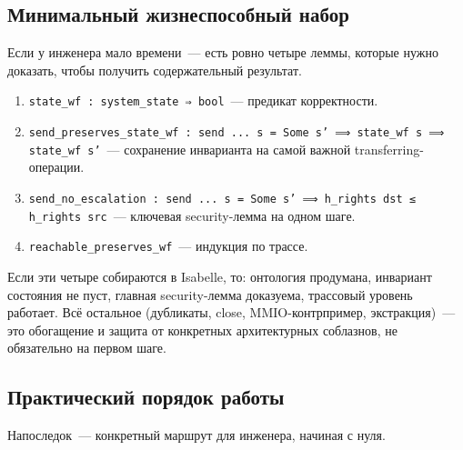 \documentclass[11pt,a4paper]{article}
\begin{document}
\subsection{Минимальный жизнеспособный набор}
\label{sec:port-mvp}

Если у инженера мало времени~--- есть ровно четыре леммы, которые нужно
доказать, чтобы получить содержательный результат.

\begin{enumerate}[leftmargin=1.4em]
	\item \texttt{state\_wf : system\_state ⇒ bool}~--- предикат корректности.
	\item \texttt{send\_preserves\_state\_wf : send ... s = Some s'
		      ⟹ state\_wf s ⟹ state\_wf s'}~--- сохранение инварианта на
	      самой важной transferring-операции.
	\item \texttt{send\_no\_escalation : send ... s = Some s'
		      ⟹ h\_rights dst ≤ h\_rights src}~--- ключевая security-лемма
	      на одном шаге.
	\item \texttt{reachable\_preserves\_wf}~--- индукция по трассе.
\end{enumerate}

Если эти четыре собираются в Isabelle, то: онтология продумана,
инвариант состояния не пуст, главная security-лемма доказуема, трассовый
уровень работает. Всё остальное (дубликаты, close, MMIO-контрпример,
экстракция)~--- это обогащение и защита от конкретных архитектурных
соблазнов, не обязательно на первом шаге.

\subsection{Практический порядок работы}
\label{sec:port-route}

Напоследок~--- конкретный маршрут для инженера, начиная с нуля.
\end{document}
